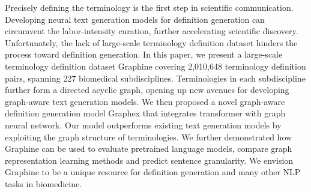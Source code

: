 Precisely defining the terminology is the first step in scientific communication. Developing neural text generation models for definition generation can circumvent the labor-intensity curation, further accelerating scientific discovery. Unfortunately, the lack of large-scale terminology definition dataset hinders the process toward definition generation. In this paper, we present a large-scale terminology definition dataset Graphine covering 2,010,648 terminology definition pairs, spanning 227 biomedical subdisciplines. Terminologies in each subdiscipline further form a directed acyclic graph, opening up new avenues for developing graph-aware text generation models. We then proposed a novel graph-aware definition generation model Graphex that integrates transformer with graph neural network. Our model outperforms existing text generation models by exploiting the graph structure of terminologies. We further demonstrated how Graphine can be used to evaluate pretrained language models, compare graph representation learning methods and predict sentence granularity. We envision Graphine to be a unique resource for definition generation and many other NLP tasks in biomedicine.
